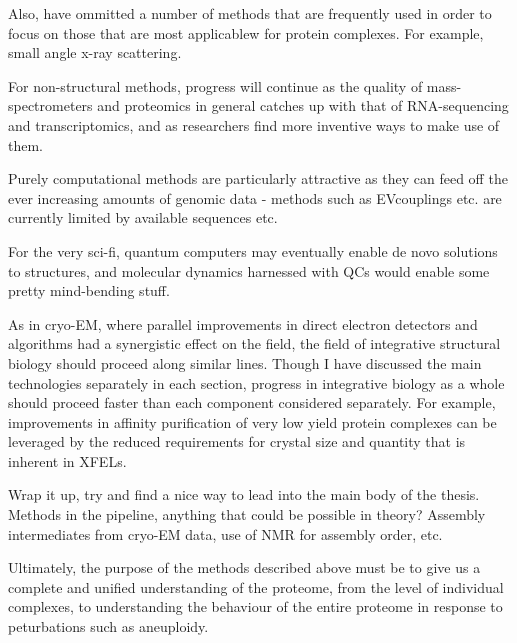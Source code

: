 \documentclass[a4paper,11pt,twoside,openright]{scrbook}
\begin{document}
Also, have ommitted a number of methods that are frequently used in order to focus on those that are most applicablew for protein complexes. For example, small angle x-ray scattering.

For non-structural methods, progress will continue as the quality of mass-spectrometers and proteomics in general catches up with that of RNA-sequencing and transcriptomics, and as researchers find more inventive ways to make use of them.

Purely computational methods are particularly attractive as they can feed off the ever increasing amounts of genomic data - methods such as EVcouplings etc. are currently limited by available sequences etc.

For the very sci-fi, quantum computers may eventually enable de novo solutions to structures, and molecular dynamics harnessed with QCs would enable some pretty mind-bending stuff.

As in cryo-EM, where parallel improvements in direct electron detectors and algorithms had a synergistic effect on the field, the field of integrative structural biology should proceed along similar lines. Though I have discussed the main technologies separately in each section, progress in integrative biology as a whole should proceed faster than each component considered separately. For example, improvements in affinity purification of very low yield protein complexes can be leveraged by the reduced requirements for crystal size and quantity that is inherent in XFELs.

Wrap it up, try and find a nice way to lead into the main body of the thesis. Methods in the pipeline, anything that could be possible in theory? Assembly intermediates from cryo-EM data, use of NMR for assembly order, etc.


Ultimately, the purpose of the methods described above must be to give us a complete and unified understanding of the proteome, from the level of individual complexes, to understanding the behaviour of the entire proteome in response to peturbations such as aneuploidy.

\printbibliography
\end{document}
